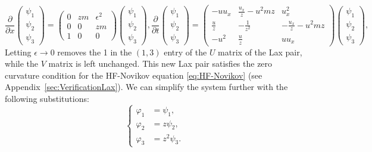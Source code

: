 \documentclass[english,master]{liumaiex}
\theoremstyle{thesisplain}
\theoremstyle{thesisdefinition}
\numberwithin{equation}{section}
\begin{document}
\begin{subequations}
  \begin{equation}
    \frac{\partial}{\partial x}
    \begin{pmatrix} \psi_1 \\ \psi_2 \\ \psi_3 \end{pmatrix} =
    \begin{pmatrix}
      0 & zm & \epsilon^2 \\
      0 & 0 & zm \\
      1 & 0 & 0
    \end{pmatrix}
    \begin{pmatrix} \psi_1 \\ \psi_2 \\ \psi_3 \end{pmatrix}
    ,
  \end{equation}
  \begin{equation}
    \frac{\partial}{\partial t}
    \begin{pmatrix} \psi_1 \\ \psi_2 \\ \psi_3 \end{pmatrix} =
    \begin{pmatrix}
      -u u_x & \frac{u_x}{z}-u^2 mz & u_x^2 \\
      \frac{u}{z} & - \frac{1}{z^2} & - \frac{u_x}{z} - u^2 mz \\
      -u^2 & \frac{u}{z} & uu_x
    \end{pmatrix}
    \begin{pmatrix} \psi_1 \\ \psi_2 \\ \psi_3 \end{pmatrix}
    ,
  \end{equation}
\end{subequations}
Letting $\epsilon \to 0$ removes the 1 in the $(1,3)$ entry of the $U$ matrix of the Lax pair, while the $V$ matrix is left unchanged. This new Lax pair satisfies the zero curvature condition for the HF-Novikov equation \eqref{eq:HF-Novikov} (see Appendix~\ref{sec:VerificationLax}). We can simplify the system further with the following substitutions:
\begin{equation}
\left\{ \begin{aligned}
	\varphi_1 &= \psi_1, \\
	\varphi_2 &= z\psi_2, \\
	\varphi_3 &= z^2\psi_3.
\end{aligned} \right.
\end{equation}
\end{document}
